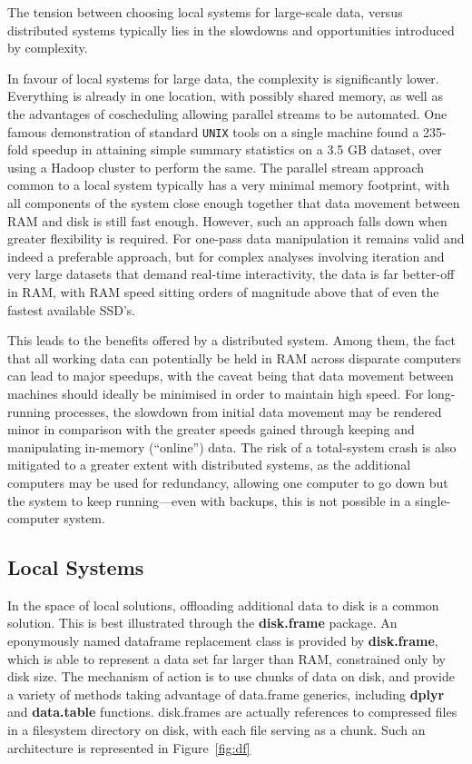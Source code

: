 The tension between choosing local systems for large-scale data, versus distributed systems typically lies in the slowdowns and opportunities introduced by complexity.

In favour of local systems for large data, the complexity is significantly lower.
Everything is already in one location, with possibly shared memory, as well as the advantages of coscheduling allowing parallel streams to be automated.
One famous demonstration of standard \texttt{UNIX} tools on a single machine found a 235-fold speedup in attaining simple summary statistics on a 3.5 GB dataset, over using a Hadoop cluster to perform the same\cite{drake2014cltvscluster}.
The parallel stream approach common to a local system typically has a very minimal memory footprint, with all components of the system close enough together that data movement between RAM and disk is still fast enough.
However, such an approach falls down when greater flexibility is required.
For one-pass data manipulation it remains valid and indeed a preferable approach, but for complex analyses involving iteration and very large datasets that demand real-time interactivity, the data is far better-off in RAM, with RAM speed sitting orders of magnitude above that of even the fastest available SSD's\cite{kim201923}\cite{samsung2020SSD}.

This leads to the benefits offered by a distributed system.
Among them, the fact that all working data can potentially be held in RAM across disparate computers can lead to major speedups, with the caveat being that data movement between machines should ideally be minimised in order to maintain high speed.
For long-running processes, the slowdown from initial data movement may be rendered minor in comparison with the greater speeds gained through keeping and manipulating in-memory (``online'') data\cite{emmerich2000engineering}.
The risk of a total-system crash is also mitigated to a greater extent with distributed systems, as the additional computers may be used for redundancy, allowing one computer to go down but the system to keep running---even with backups, this is not possible in a single-computer system.

\subsection{Local Systems}

In the space of local solutions, offloading additional data to disk is a common solution.
This is best illustrated through the \textbf{disk.frame} package\cite{zj20}.
An eponymously named dataframe replacement class is provided by \textbf{disk.frame}, which is able to represent a data  set far larger than RAM, constrained only by disk size.
The mechanism of action is to use chunks of data on disk, and provide a variety of methods taking advantage of data.frame generics, including \textbf{dplyr} and \textbf{data.table} functions.
disk.frames are actually references to compressed files in a filesystem directory on disk, with each file serving as a chunk.
Such an architecture is represented in Figure~\ref{fig:df}

